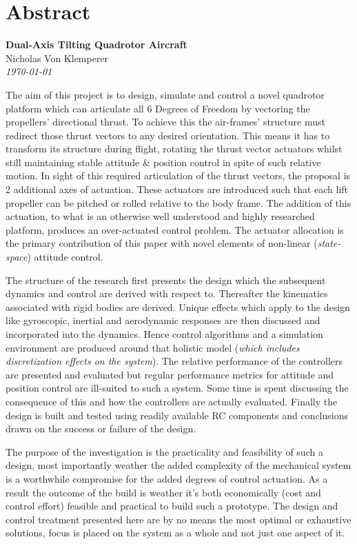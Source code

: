 \documentclass[a4paper, 11pt, oneside, openright, parskip=full]{book}
\newcommand{\auth}{Nicholas Von Klemperer}								%
\newcommand{\titl}{Dual-Axis Tilting Quadrotor Aircraft}						%
\begin{document}
\chapter{Abstract}				
\label{ch:abs}
\begin{center}
	\textbf{\Large \titl}\\
			\vskip 0.2cm
			\auth\\
			\vskip 0.2cm
	\textit{\footnotesize\today}
			\vskip 1cm
\end{center}
The aim of this project is to design, simulate and control a novel quadrotor platform which can articulate all 6 Degrees of Freedom by vectoring the propellers' directional thrust. To achieve this the air-frames' structure must redirect those thrust vectors to any desired orientation. This means it has to transform its structure during flight, rotating the thrust vector actuators whilst still maintaining stable attitude \& position control in spite of such relative motion. In sight of this required articulation of the thrust vectors, the proposal is 2 additional axes of actuation. These actuators are introduced such that each lift propeller can be pitched or rolled relative to the body frame. The addition of this actuation, to what is an otherwise well understood and highly researched platform, produces an over-actuated control problem. The actuator allocation is the primary contribution of this paper with novel elements of non-linear (\emph{state-space}) attitude control.
\par
The structure of the research first presents the design which the subsequent dynamics and control are derived with respect to. Thereafter the kinematics associated with rigid bodies are derived. Unique effects which apply to the design like gyroscopic, inertial and aerodynamic responses are then discussed and incorporated into the dynamics. Hence control algorithms and a simulation environment are produced around that holistic model (\emph{which includes discretization effects on the system}). The relative performance of the controllers are presented and evaluated but regular performance metrics for attitude and position control are ill-suited to such a system. Some time is spent discussing the consequence of this and how the controllers are actually evaluated. Finally the design is built and tested using readily available RC components and conclusions drawn on the success or failure of the design.
\par
The purpose of the investigation is the practicality and feasibility of such a design, most importantly weather the added complexity of the mechanical system is a worthwhile compromise for the added degrees of control actuation. As a result the outcome of the build is weather it's both economically (cost and control effort) feasible and practical to build such a prototype. The design and control treatment presented here are by no means the most optimal or exhaustive solutions, focus is placed on the system as a whole and not just one aspect of it.
\end{document}
